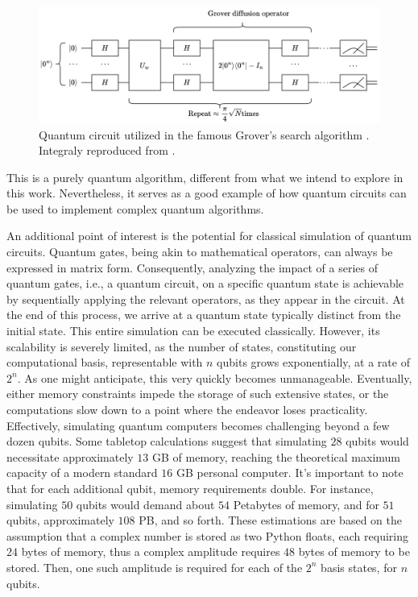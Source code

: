 \begin{figure}[H]
    \centering
    \includegraphics[width=\textwidth]{Figures/Diagrams/Grover_Circuit.png}
    \caption{Quantum circuit utilized in the famous Grover's search algorithm \cite{Grover}. Integraly reproduced from \cite{e26030216}.}
    \label{fig:QCircuit}
\end{figure}
\noindent This is a purely quantum algorithm, different from what we intend to explore in this work. Nevertheless, it serves as a good example of how quantum circuits can be used to implement complex quantum algorithms.

An additional point of interest is the potential for classical simulation of quantum circuits. Quantum gates, being akin to mathematical operators, can always be expressed in matrix form. Consequently, analyzing the impact of a series of quantum gates, i.e., a quantum circuit, on a specific quantum state is achievable by sequentially applying the relevant operators, as they appear in the circuit. At the end of this process, we arrive at a quantum state typically distinct from the initial state. This entire simulation can be executed classically. However, its scalability is severely limited, as the number of states, constituting our computational basis, representable with $n$ qubits grows exponentially, at a rate of $2^n$. As one might anticipate, this very quickly becomes unmanageable. Eventually, either memory constraints impede the storage of such extensive states, or the computations slow down to a point where the endeavor loses practicality. Effectively, simulating quantum computers becomes challenging beyond a few dozen qubits. Some tabletop calculations suggest that simulating $28$ qubits would necessitate approximately $13$ GB of memory, reaching the theoretical maximum capacity of a modern standard $16$ GB personal computer. It's important to note that for each additional qubit, memory requirements double. For instance, simulating $50$ qubits would demand about $54$ Petabytes of memory, and for $51$ qubits, approximately $108$ PB, and so forth. These estimations are based on the assumption that a complex number is stored as two Python floats, each requiring $24$ bytes of memory, thus a complex amplitude requires $48$ bytes of memory to be stored. Then, one such amplitude is required for each of the $2^{n}$ basis states, for $n$ qubits.


